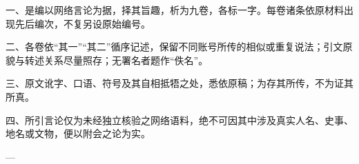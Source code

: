 一、是编以网络言论为据，择其旨趣，析为九卷，各标一字。每卷诸条依原材料出现先后编次，不复另设原始编号。

二、各卷依“其一”“其二”循序记述，保留不同账号所传的相似或重复说法；引文原貌与转述关系尽量照存；无署名者题作“佚名”。

三、原文讹字、口语、符号及其自相抵牾之处，悉依原稿；为存其所传，不为证其所真。

四、所引言论仅为未经独立核验之网络语料，绝不可因其中涉及真实人名、史事、地名或文物，便以附会之论为实。

---


